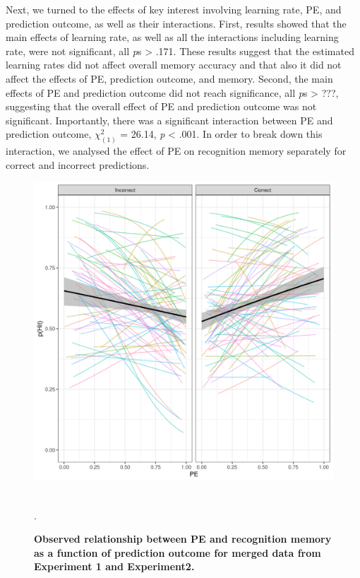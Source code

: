 \documentclass[a4paper,12pt]{article}
\begin{document}
  Next, we turned to the effects of key interest involving learning rate, PE, and prediction outcome, as well as their interactions. First, results showed that the main effects of learning rate, as well as all the interactions including learning rate, were not significant, all \textit{p}s > .171. These results suggest that the estimated learning rates did not affect overall memory accuracy and that also it did not affect the effects of PE, prediction outcome, and memory. Second, the main effects of PE and prediction outcome did not reach significance, all \textit{p}s > ???, suggesting that the overall effect of PE and prediction outcome was not significant. Importantly, there was a significant interaction between PE and prediction outcome, $\chi^2_{(1)}$ = 26.14, \textit{p} < .001. In order to break down this interaction, we analysed the effect of PE on recognition memory separately for correct and incorrect predictions. 






\begin{figure}
{\includegraphics[width=1\textwidth]{figures/PE_mem_fLR_instr.exp1.exp2.png}}\
\caption{\textbf{Observed relationship between PE and recognition memory as a function of prediction outcome for merged data from Experiment 1 and Experiment2.}  }
\label{fig:PE_Mem_1_2}. 

\end{figure}
\end{document}
